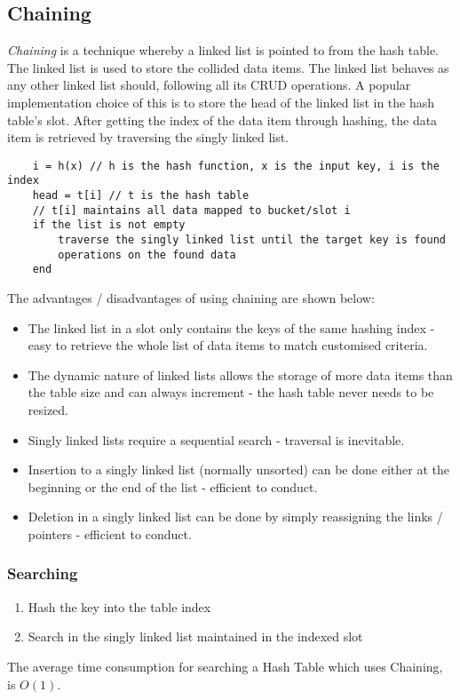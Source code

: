 \subsection{Chaining}
\textit{Chaining} is a technique whereby a linked list is pointed to from the hash table. The linked list is used to store the collided data items. The linked list behaves as any other linked list should, following all its CRUD operations. A popular implementation choice of this is to store the head of the linked list in the hash table's slot. After getting the index of the data item through hashing, the data item is retrieved by traversing the singly linked list.
\begin{verbatim}
    i = h(x) // h is the hash function, x is the input key, i is the index
    head = t[i] // t is the hash table
    // t[i] maintains all data mapped to bucket/slot i
    if the list is not empty
        traverse the singly linked list until the target key is found
        operations on the found data
    end
\end{verbatim}
The advantages / disadvantages of using chaining are shown below:
\begin{itemize}
    \item The linked list in a slot only contains the keys of the same hashing index - easy to retrieve the whole list of data items to match customised criteria.
    \item The dynamic nature of linked lists allows the storage of more data items than the table size and can always increment - the hash table never needs to be resized.
    \item Singly linked lists require a sequential search - traversal is inevitable.
    \item Insertion to a singly linked list (normally unsorted) can be done either at the beginning or the end of the list - efficient to conduct.
    \item Deletion in a singly linked list can be done by simply reassigning the links / pointers - efficient to conduct.
\end{itemize}
\subsubsection{Searching}
\begin{enumerate}
    \item Hash the key into the table index
    \item Search in the singly linked list maintained in the indexed slot
\end{enumerate}
The average time consumption for searching a Hash Table which uses Chaining, is $O(1)$. 
